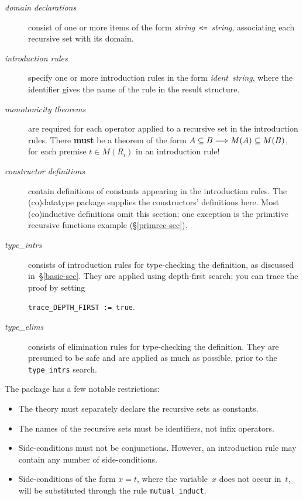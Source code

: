 \documentclass[12pt]{article}
\newcommand\sbs{\subseteq}
\newcommand\defn[1]{{\bf#1}}
\begin{document}
\begin{description}
\item[\it domain declarations] consist of one or more items of the form
  {\it string\/}~{\tt <=}~{\it string}, associating each recursive set with
  its domain.

\item[\it introduction rules] specify one or more introduction rules in
  the form {\it ident\/}~{\it string}, where the identifier gives the name of
  the rule in the result structure.

\item[\it monotonicity theorems] are required for each operator applied to
  a recursive set in the introduction rules.  There \defn{must} be a theorem
  of the form $A\sbs B\Imp M(A)\sbs M(B)$, for each premise $t\in M(R_i)$
  in an introduction rule!

\item[\it constructor definitions] contain definitions of constants
  appearing in the introduction rules.  The (co)datatype package supplies
  the constructors' definitions here.  Most (co)inductive definitions omit
  this section; one exception is the primitive recursive functions example
  (\S\ref{primrec-sec}).

\item[\it type\_intrs] consists of introduction rules for type-checking the
  definition, as discussed in~\S\ref{basic-sec}.  They are applied using
  depth-first search; you can trace the proof by setting

  \verb|trace_DEPTH_FIRST := true|.

\item[\it type\_elims] consists of elimination rules for type-checking the
  definition.  They are presumed to be safe and are applied as much as
  possible, prior to the {\tt type\_intrs} search.
\end{description}

The package has a few notable restrictions:
\begin{itemize}
\item The theory must separately declare the recursive sets as
  constants.

\item The names of the recursive sets must be identifiers, not infix
operators.  

\item Side-conditions must not be conjunctions.  However, an introduction rule
may contain any number of side-conditions.

\item Side-conditions of the form $x=t$, where the variable~$x$ does not
  occur in~$t$, will be substituted through the rule \verb|mutual_induct|.
\end{itemize}
\end{document}
